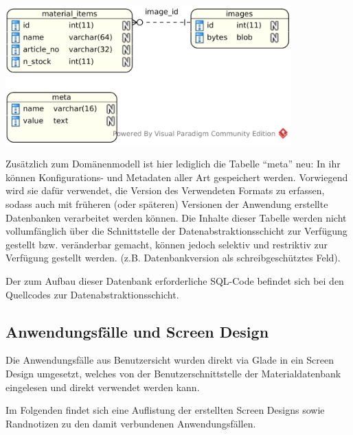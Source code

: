 \begin{center}
\noindent\includegraphics[width=110mm,keepaspectratio]{images/03-datenbankmodell.png}
\end{center}

Zusätzlich zum Domänenmodell ist hier lediglich die Tabelle ``meta'' neu: In ihr können
Konfigurations- und Metadaten aller Art gespeichert werden. Vorwiegend wird sie dafür
verwendet, die Version des Verwendeten Formats zu erfassen, sodass auch mit früheren
(oder späteren) Versionen der Anwendung erstellte Datenbanken verarbeitet werden können.
Die Inhalte dieser Tabelle werden nicht vollumfänglich über die Schnittstelle der
Datenabstraktionsschicht zur Verfügung gestellt bzw. veränderbar gemacht, können jedoch selektiv
und restriktiv zur Verfügung gestellt werden. (z.B. Datenbankversion als schreibgeschütztes Feld).

Der zum Aufbau dieser Datenbank erforderliche SQL-Code befindet sich bei den Quellcodes
zur Datenabstraktionsschicht.

\subsection{Anwendungsfälle und Screen Design}
Die Anwendungsfälle aus Benutzersicht wurden direkt via Glade in ein Screen Design umgesetzt, welches von der
Benutzerschnittstelle der Materialdatenbank eingelesen und direkt verwendet werden kann.

Im Folgenden findet sich eine Auflistung der erstellten Screen Designs sowie Randnotizen zu den damit verbundenen
Anwendungsfällen.

